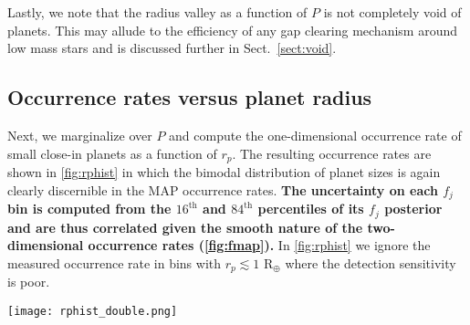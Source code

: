 \documentclass[twocolumn]{emulateapj}
\newcommand{\kepler}[1]{\emph{Kepler}#1}
\newcommand{\ktwo}[1]{\emph{K2}#1}
\begin{document}
Lastly, we note that the radius valley as a function of $P$ is not completely void of planets.
This may allude to the efficiency of any gap clearing mechanism around low mass stars and is
discussed further in Sect.~\ref{sect:void}.

\vspace{1cm}

\subsection{Occurrence rates versus planet radius}
Next, we marginalize over $P$ and compute the one-dimensional occurrence rate of small close-in planets
as a function of $r_p$. The resulting occurrence rates are shown in \autoref{fig:rphist} in which the bimodal
distribution of planet sizes is again clearly discernible in the MAP occurrence rates.
\textbf{The uncertainty on each $f_j$ bin is computed from the $16^{\text{th}}$ and $84^{\text{th}}$ percentiles
  of its $f_j$ posterior and are thus correlated given the smooth nature of the two-dimensional occurrence
  rates (\autoref{fig:fmap}).}
In \autoref{fig:rphist} we ignore the measured occurrence rate in bins with
$r_p\lesssim 1$ R$_{\oplus}$ where the detection sensitivity is poor.

  
\begin{figure*}
  \centering
  \texttt{[image: rphist\_double.png]}
  \caption{Occurrence rate of planets as a function of size. \emph{Upper panel}:
    histogram depicting the relative occurrence
    rate of close-in planets with orbital periods $<100$ days derived from the population of confirmed
    \kepler{} and \ktwo{} planets around low mass stars. The bimodal distribution of planet radii peaking
    at occurrence rate-weighted radii of 1.12 and 2.07 R$_{\oplus}$ indicates the presence of the radius valley
    around low mass stars centered at 1.54 R$_{\oplus}$. Uncertainties in the planet occurrences follow from binomial
    statistics and are limited by
    the relatively small number of confirmed planets around low mass stars from \kepler{} and \ktwo{.} 
    The measured occurrence rates below $\sim 1$ R$_{\oplus}$ (shown in \emph{grey}) should be ignored due to
    poor detection sensitivity. \emph{Lower panel}: identical occurrence rates as in the upper panel 
    accompanied by the same occurrence rates but with finer radius bins.
    The corresponding occurrence rate uncertainties per bin are inflated but the bimodal structure continues
    to be exhibited in the MAP occurrence rates. The shaded regions highlight our approximate
    definitions of rocky planets ($r_p \in [0.97,1.54]$ R$_{\oplus}$), down to reasonable sensitivity limits,
    and non-rocky planets ($r_p > 1.54$ R$_{\oplus}$) around low mass stars. Note the 2.5 R$_{\oplus}$ outer limit of
    the shaded region is chosen arbitrarily.}
  \label{fig:rphist}
\end{figure*}
\end{document}
